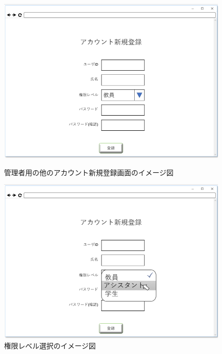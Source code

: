 \begin{figure}[htbp]
 \begin{minipage}{0.5\hsize}
  \begin{center}
   \includegraphics[width=1\linewidth,clip]{./img/07.png}
  \end{center}
  \caption{管理者用の他のアカウント新規登録画面のイメージ図}\label{fig:07}
 \end{minipage}
 \begin{minipage}{0.5\hsize}
  \begin{center}
   \includegraphics[width=1\linewidth,clip]{./img/08.png}
  \end{center}
  \caption{権限レベル選択のイメージ図　　　　　　　　　　　}\label{fig:08}
 \end{minipage}
\end{figure}


